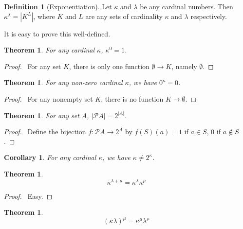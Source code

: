\documentclass{report}
\let\qed\relax
\newtheorem{theorem}[axiom]{Theorem}
\newtheorem{corollary}{Corollary}[axiom]
\theoremstyle{definition}
\newtheorem{definition}[axiom]{Definition}
\begin{document}
    \begin{definition}[Exponentiation]
        Let $\kappa$ and $\lambda$ be any cardinal numbers. Then $\kappa^\lambda = |K^L|$,
        where $K$ and $L$ are any sets of cardinality $\kappa$ and $\lambda$ respectively.
    \end{definition}

    It is easy to prove this well-defined.

    \begin{theorem}
        For any cardinal $\kappa$, $\kappa^0 = 1$.
    \end{theorem}

    \begin{proof}
        \pf\ For any set $K$, there is only one function $\emptyset \rightarrow K$, namely $\emptyset$. \qed
    \end{proof}

    \begin{theorem}
        For any non-zero cardinal $\kappa$, we have $0^\kappa = 0$.
    \end{theorem}

    \begin{proof}
        \pf\ For any nonempty set $K$, there is no function $K \rightarrow \emptyset$. \qed
    \end{proof}

    \begin{theorem}
        For any set $A$, $|\mathcal{P} A| = 2^{|A|}$.
    \end{theorem}

    \begin{proof}
        \pf\ Define the bijection $f : \mathcal{P} A \rightarrow 2^A$ by $f(S)(a) = 1$ if $a \in S$,
        0 if $a \notin S$. \qed
    \end{proof}

    \begin{corollary}
        For any cardinal $\kappa$, we have $\kappa \neq 2^\kappa$.
    \end{corollary}

    \begin{theorem}
        \[ \kappa^{\lambda + \mu} = \kappa^\lambda \kappa^\mu \]
    \end{theorem}

    \begin{proof}
        \pf\ Easy. \qed
    \end{proof}

    \begin{theorem}
        \[ (\kappa \lambda)^\mu = \kappa^\mu \lambda^\mu \]
    \end{theorem}
\end{document}
